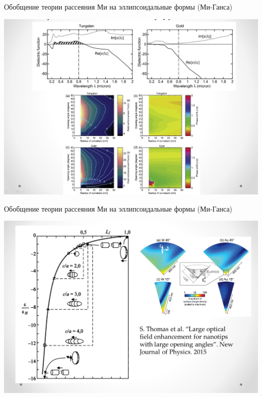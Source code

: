 \documentclass[9pt, compress, xcolor=table]{beamer}
\begin{document}
\begin{frame}{Обобщение теории рассеяния Ми на эллипсоидальные формы (Ми-Ганса)}

\begin{center}
\includegraphics[width=1.1\textwidth]{add_sl6}
\end{center}

\end{frame}

\begin{frame}{Обобщение теории рассеяния Ми на эллипсоидальные формы (Ми-Ганса)}

\begin{center}
\includegraphics[width=1.1\textwidth]{add_sl7}
\end{center}
    
\end{frame}
\end{document}
